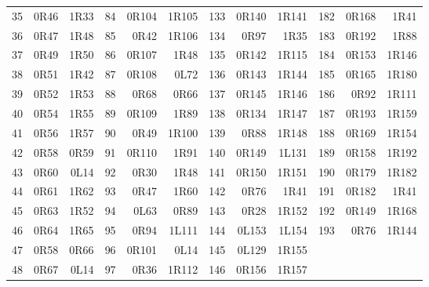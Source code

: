 \begin{center}
\begin{tabular}{@{}rrr@{\hspace{11pt}}rrr@{\hspace{11pt}}rrr@{\hspace{11pt}}rrr@{}}
35 & 0R46 & 1R33 & 84 & 0R104 & 1R105 & 133 & 0R140 & 1R141 & 182 & 0R168 & 1R41 \\
36 & 0R47 & 1R48 & 85 & 0R42 & 1R106 & 134 & 0R97 & 1R35 & 183 & 0R192 & 1R88 \\
37 & 0R49 & 1R50 & 86 & 0R107 & 1R48 & 135 & 0R142 & 1R115 & 184 & 0R153 & 1R146 \\
38 & 0R51 & 1R42 & 87 & 0R108 & 0L72 & 136 & 0R143 & 1R144 & 185 & 0R165 & 1R180 \\
39 & 0R52 & 1R53 & 88 & 0R68 & 0R66 & 137 & 0R145 & 1R146 & 186 & 0R92 & 1R111 \\
40 & 0R54 & 1R55 & 89 & 0R109 & 1R89 & 138 & 0R134 & 1R147 & 187 & 0R193 & 1R159 \\
41 & 0R56 & 1R57 & 90 & 0R49 & 1R100 & 139 & 0R88 & 1R148 & 188 & 0R169 & 1R154 \\
42 & 0R58 & 0R59 & 91 & 0R110 & 1R91 & 140 & 0R149 & 1L131 & 189 & 0R158 & 1R192 \\
43 & 0R60 & 0L14 & 92 & 0R30 & 1R48 & 141 & 0R150 & 1R151 & 190 & 0R179 & 1R182 \\
44 & 0R61 & 1R62 & 93 & 0R47 & 1R60 & 142 & 0R76 & 1R41 & 191 & 0R182 & 1R41 \\
45 & 0R63 & 1R52 & 94 & 0L63 & 0R89 & 143 & 0R28 & 1R152 & 192 & 0R149 & 1R168 \\
46 & 0R64 & 1R65 & 95 & 0R94 & 1L111 & 144 & 0L153 & 1L154 & 193 & 0R76 & 1R144 \\
47 & 0R58 & 0R66 & 96 & 0R101 & 0L14 & 145 & 0L129 & 1R155 &  &  &  \\
48 & 0R67 & 0L14 & 97 & 0R36 & 1R112 & 146 & 0R156 & 1R157 &  &  &  \\
\bottomrule
\end{tabular}
\end{center}
